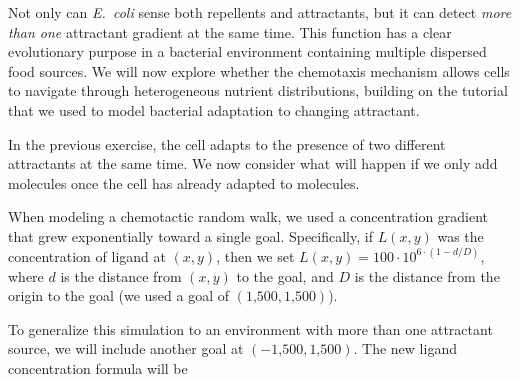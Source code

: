 Not only can \textit{E.~coli} sense both repellents and attractants, but it can detect \textit{more than one} attractant gradient at the same time.  This function has a clear evolutionary purpose in a bacterial environment containing multiple dispersed food sources. We will now explore whether the chemotaxis mechanism allows cells to navigate through heterogeneous nutrient distributions, building on the tutorial that we used to model bacterial adaptation to changing attractant.\\

\begin{exercise}\end{exercise}

In the previous exercise, the cell adapts to the presence of two different attractants at the same time. We now consider what will happen if we only add  molecules once the cell has already adapted to  molecules.\\

\begin{exercise}\end{exercise}

When modeling a chemotactic random walk, we used a concentration gradient that grew exponentially toward a single goal. Specifically, if $L(x,y)$ was the concentration of ligand at $(x, y)$, then we set $L(x,y) = 100 \cdot 10^{6 \cdot (1-d/D)}$, where $d$ is the distance from $(x,y)$ to the goal, and $D$ is the distance from the origin to the goal (we used a goal of $(\text{1,500}, \text{1,500})$).

To generalize this simulation to an environment with more than one attractant source, we will include another goal at $(-\text{1,500}, \text{1,500})$. The new ligand concentration formula will be

